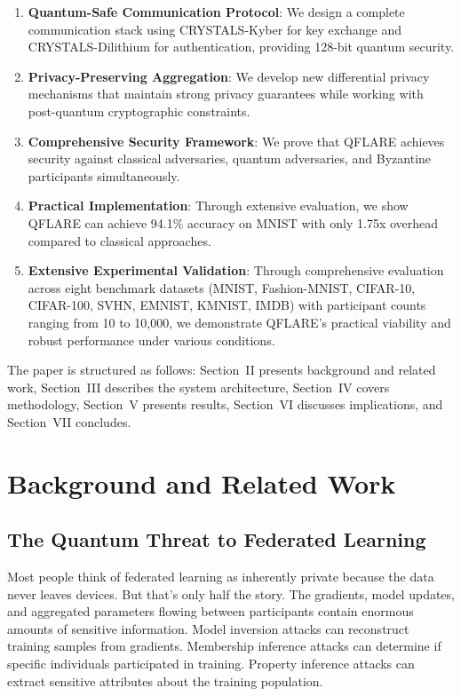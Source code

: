 \documentclass[journal,onecolumn]{IEEEtran}
\begin{document}
\begin{enumerate}
\item \textbf{Quantum-Safe Communication Protocol}: We design a complete communication stack using CRYSTALS-Kyber for key exchange and CRYSTALS-Dilithium for authentication, providing 128-bit quantum security.

\item \textbf{Privacy-Preserving Aggregation}: We develop new differential privacy mechanisms that maintain strong privacy guarantees while working with post-quantum cryptographic constraints.

\item \textbf{Comprehensive Security Framework}: We prove that QFLARE achieves security against classical adversaries, quantum adversaries, and Byzantine participants simultaneously.

\item \textbf{Practical Implementation}: Through extensive evaluation, we show QFLARE can achieve 94.1\% accuracy on MNIST with only 1.75x overhead compared to classical approaches.

\item \textbf{Extensive Experimental Validation}: Through comprehensive evaluation across eight benchmark datasets (MNIST, Fashion-MNIST, CIFAR-10, CIFAR-100, SVHN, EMNIST, KMNIST, IMDB) with participant counts ranging from 10 to 10,000, we demonstrate QFLARE's practical viability and robust performance under various conditions.
\end{enumerate}

The paper is structured as follows: Section~II presents background and related work, Section~III describes the system architecture, Section~IV covers methodology, Section~V presents results, Section~VI discusses implications, and Section~VII concludes.

\section{Background and Related Work}

\subsection{The Quantum Threat to Federated Learning}

Most people think of federated learning as inherently private because the data never leaves devices. But that's only half the story. The gradients, model updates, and aggregated parameters flowing between participants contain enormous amounts of sensitive information. Model inversion attacks can reconstruct training samples from gradients. Membership inference attacks can determine if specific individuals participated in training. Property inference attacks can extract sensitive attributes about the training population.
\end{document}
